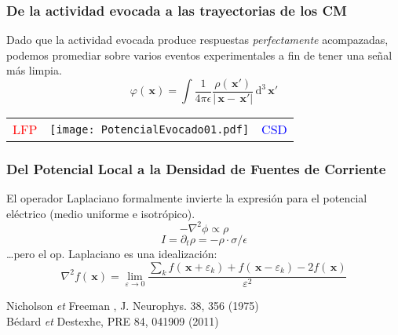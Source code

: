\documentclass{beamer}
\newcommand{\dd}{\, \mathrm{d}}
\newcommand{\xq}{\, \mathbf{x}}
\begin{document}
\begin{frame}
  \frametitle{De la actividad evocada a las trayectorias de los CM}
  Dado que la actividad evocada produce respuestas
  \emph{perfectamente} acompazadas, podemos
  promediar sobre varios eventos experimentales
  a fin de tener una señal más limpia. 
  \begin{equation}
    \varphi(\xq)
    =\int \frac{1}{4\pi\epsilon}
    \frac{\rho(\xq')}{|\xq-\xq'|} \dd^3 \xq'  
  \end{equation}
  \begin{center}
  \begin{tabular}{ccc}
   \textcolor{red}{LFP} & 
   \texttt{[image: PotencialEvocado01.pdf]} &
   \textcolor{blue}{CSD}
  \end{tabular}
  \end{center}
\end{frame}


\begin{frame}
\frametitle{Del Potencial Local a la Densidad de Fuentes de Corriente} 
El operador Laplaciano formalmente invierte la expresión para
el potencial eléctrico (medio uniforme e isotrópico).
\begin{equation}
  -\nabla^2\phi \propto \rho
\end{equation}
\begin{equation}
I=\partial_t \rho= - \rho \cdot \sigma/\epsilon 
  \end{equation}
\ldots pero el op. Laplaciano es una idealización:
\begin{equation}
  \nabla^2 f (\xq) =\lim_{\varepsilon \to 0}
  \frac{\sum_k f(\xq+\varepsilon_k)+ f(\xq-\varepsilon_k)-2 f(\xq)}
       {\varepsilon^2}  
\end{equation}
\begin{flushright}
  {\tiny Nicholson \emph{et} Freeman , J.   Neurophys. 38, 356 (1975)\\
         Bédard \emph{et} Destexhe, PRE 84, 041909 (2011) }
\end{flushright}

\end{frame}
\end{document}
